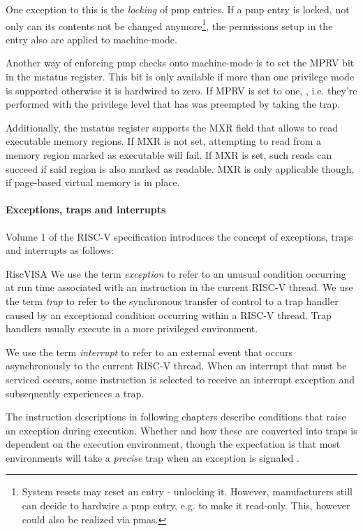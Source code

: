 One exception to this is the \textit{locking} of \gls{pmp} entries.
If a \gls{pmp} entry is locked, not only can its contents not be changed anymore\footnote{%
    System resets may reset an entry - unlocking it.
    However, manufacturers still can decide to hardwire a \gls{pmp} entry, e.g. to make it read-only.
    This, however could also be realized via \glspl{pma}.
}, the permissions setup in the entry also are applied to machine-mode.

Another way of enforcing \gls{pmp} checks onto machine-mode is to set the MPRV bit in the \gls{mstatus} register.
This bit is only available if more than one privilege mode is supported otherwise it is hardwired to zero.
If MPRV is set to one, , i.e. they're performed with the privilege level that has was preempted by taking the trap.

Additionally, the \gls{mstatus} register supports the MXR field that allows to read executable memory regions.
If MXR is not set, attempting to read from a memory region marked as executable will fail.
If MXR is set, such reads can succeed if said region is also marked as readable.
MXR is only applicable though, if page-based virtual memory is in place.

\paragraph{Exceptions, traps and interrupts}

Volume 1 of the RISC-V specification \cite{RiscVISA} introduces the concept of exceptions, traps and interrupts as follows:
\begin{displaycquote}{RiscVISA}
    We use the term \textit{exception} to refer to an unusual condition occurring at run time associated with an instruction in the current RISC-V thread.
    We use the term \textit{trap} to refer to the synchronous transfer of control to a trap handler caused by an exceptional condition occurring within a RISC-V thread.
    Trap handlers usually execute in a more privileged environment.

    We use the term \textit{interrupt} to refer to an external event that occurs asynchronously to the current RISC-V thread.
    When an interrupt that must be serviced occurs, some instruction is selected to receive an interrupt exception and subsequently experiences a trap.

    The instruction descriptions in following chapters describe conditions that raise an exception during execution.
    Whether and how these are converted into traps is dependent on the execution environment, though the expectation is that most environments will take a \textit{precise} trap when an exception is signaled \textelp{}.
\end{displaycquote}


